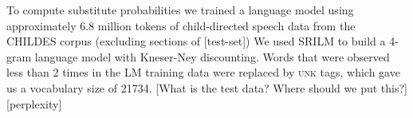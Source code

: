 

To compute substitute probabilities we trained a language model using
approximately 6.8 million tokens of child-directed speech data from
the CHILDES corpus \citep*{macwhinney2000childes} (excluding sections of
[test-set])
We used SRILM \citep*{Stolcke2002} to build a 4-gram language model with
Kneser-Ney discounting.
Words that were observed less than 2 times in the LM training data
were replaced by \textsc{unk} tags, which gave us a vocabulary size of
21734.
[What is the test data? Where should we put this?]
[perplexity]
